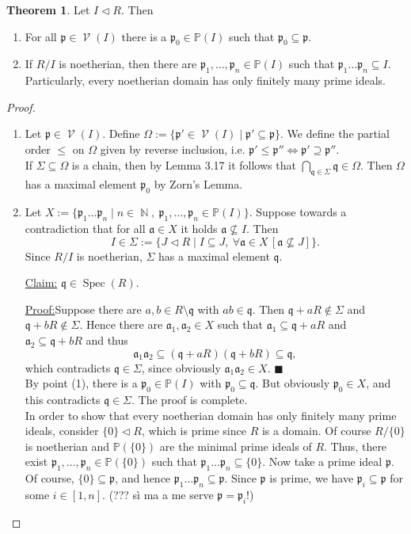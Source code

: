 \documentclass[12pt,a4paper]{report}
\theoremstyle{definition}
\newtheorem{theorem}{Theorem}[chapter] %
\theoremstyle{num.custom-title}
\newenvironment{claim}[1]{\par\noindent\underline{Claim#1:}\space}{} %
\newenvironment{claimproof}[1]{\par\noindent\underline{Proof:}\space#1}{\leavevmode\unskip\penalty9999 \hbox{}\nobreak\hfill\quad\hbox{$\blacksquare$}} %
\DeclareMathOperator{\N}{\mathbb{N}}
\DeclareMathOperator{\V}{\mathcal{V}}
\DeclareMathOperator{\sm}{\setminus}
\DeclareMathOperator{\sse}{\subseteq}
\DeclareMathOperator{\Spec}{Spec}
\newcommand{\p}{\mathfrak{p}}
\renewcommand{\P}{\mathbb{P}}
\begin{document}
\begin{theorem}
Let $I \lhd R$. Then
\begin{enumerate}
\item For all $\p \in \V(I)$ there is a $\p_0 \in \P(I)$ such that $\p_0 \sse \p$.
\item If $R/I$ is noetherian, then there are $\p_1,...,\p_n \in \P(I)$ such that $\p_1 \ldots \p_n \sse I$. Particularly, every noetherian domain has only finitely many prime ideals.
\end{enumerate}
\begin{proof}\ 
\begin{enumerate}
\item Let $\p \in \V(I)$. Define $\Omega := \{ \p' \in \V(I) \mid \p' \sse \p \}$. We define the partial order $\leq$ on $\Omega$ given by reverse inclusion, i.e. $\p' \leq \p'' \Leftrightarrow \p' \supseteq \p''$.\\
If $\Sigma \sse \Omega$ is a chain, then by Lemma 3.17 it follows that $\bigcap_{\mathfrak{q} \in \Sigma} \mathfrak{q} \in \Omega$. Then $\Omega$ has a maximal element $\p_0$ by Zorn's Lemma.
\item Let $X := \{ \p_1 \ldots \p_n \mid n \in \N, \ \p_1,...,\p_n \in \P(I) \}$. Suppose towards a contradiction that for all $\mathfrak{a} \in X$ it holds $\mathfrak{a} \not\subseteq I$. Then
\[
I \in \Sigma := \Big\{ J \lhd R \mid I \sse J, \ \forall \mathfrak{a} \in X \, [\mathfrak{a} \not\subseteq J] \Big\}.
\]
Since $R/I$ is noetherian, $\Sigma$ has a maximal element $\mathfrak{q}$.
\begin{claim}{}
$\mathfrak{q} \in \Spec(R)$.
\begin{claimproof}
Suppose there are $a,b \in R \sm \mathfrak{q}$ with $ab \in \mathfrak{q}$. Then $\mathfrak{q}+aR \not\in \Sigma$ and $\mathfrak{q}+bR \not\in \Sigma$. Hence there are $\mathfrak{a}_1, \mathfrak{a}_2 \in X$ such that $\mathfrak{a}_1 \sse \mathfrak{q}+aR$ and $\mathfrak{a}_2 \sse \mathfrak{q}+bR$ and thus
\[
\mathfrak{a}_1 \mathfrak{a}_2 \sse (\mathfrak{q}+aR)(\mathfrak{q}+bR) \sse \mathfrak{q},
\]
which contradicts $\mathfrak{q} \in \Sigma$, since obviously $\mathfrak{a}_1 \mathfrak{a}_2 \in X$.
\end{claimproof}
\end{claim}\\
By point (1), there is a $\p_0 \in \P(I)$ with $\p_0 \sse \mathfrak{q}$. But obviously $\p_0 \in X$, and this contradicts $\mathfrak{q} \in \Sigma$. The proof is complete.
\\[6pt]
In order to show that every noetherian domain has only finitely many prime ideals, consider $\{0\} \lhd R$, which is prime since $R$ is a domain. Of course $R/\{0\}$ is noetherian and $\P(\{0\})$ are the minimal prime ideals of $R$. Thus, there exist $\p_1,...,\p_n \in \P(\{0\})$ such that $\p_1 \ldots \p_n \sse \{0\}$. Now take a prime ideal $\p$. Of course, $\{0\} \sse \p$, and hence $\p_1 \ldots \p_n \sse \p$. Since $\p$ is prime, we have $\p_i \sse \p$ for some $i \in [1,n]$. (??? sì ma a me serve $\p=\p_i$!)
\end{enumerate}
\end{proof}
\end{theorem}
\end{document}
